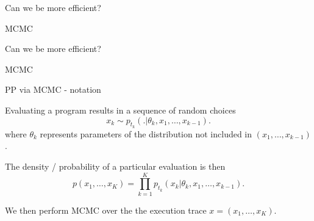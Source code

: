 \begin{frame}{Can we be more efficient?}
  \begin{block}{MCMC}
    
  \end{block}
\end{frame}

\begin{frame}{Can we be more efficient?}
  \begin{block}{MCMC}
    
  \end{block}
\end{frame}

\begin{frame}{PP via MCMC - notation}
  \begin{block}{}
    Evaluating a program results in a sequence of random choices
    \begin{equation*}
      x_k \sim p_{t_k}(.|\theta_{k},x_1,\ldots,x_{k-1}).
    \end{equation*}
    where $\theta_{k}$ represents parameters of the distribution not included in $(x_1,\ldots,x_{k-1})$.
    \newline
    
    The density / probability of a particular evaluation is then
    \begin{equation*}
      p(x_1,\ldots,x_K) = \prod_{k=1}^K p_{t_k}(x_k|\theta_{k},x_1,\ldots,x_{k-1}).
    \end{equation*}
    
    We then perform MCMC over the the execution trace $x = (x_1,\ldots,x_K)$.
    
  \end{block}
\end{frame}

